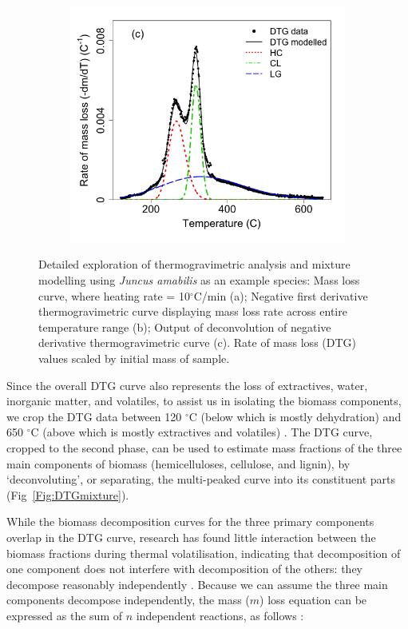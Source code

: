 \documentclass{article}
\begin{document}
\begin{figure}
	\begin{subfigure}[!ht]{0.3\textwidth}
		\includegraphics[width=\textwidth]{figs/DTG-mixture.png}
	\end{subfigure}
	\caption{Detailed exploration of thermogravimetric analysis and mixture modelling using \textit{Juncus amabilis} as an example species: Mass loss curve, where heating rate = 10$^\circ$C/min (a); Negative first derivative thermogravimetric curve displaying mass loss rate across entire temperature range (b); Output of deconvolution of negative derivative thermogravimetric curve (c). Rate of mass loss (DTG) values scaled by initial mass of sample.}
	\label{Fig:TGAmethod}
\end{figure}

Since the overall DTG curve also represents the loss of extractives, water, inorganic matter, and volatiles, to assist us in isolating the biomass components, we crop the DTG data between 120 $^{\circ}$C (below which is mostly dehydration) and 650 $^{\circ}$C (above which is mostly extractives and volatiles) \citep{hu2016,samtani2002}. The DTG curve, cropped to the second phase, can be used to estimate mass fractions of the three main components of biomass (hemicelluloses, cellulose, and lignin), by `deconvoluting', or separating, the multi-peaked curve into its constituent parts (Fig~\ref{Fig:DTGmixture}). 

While the biomass decomposition curves for the three primary components overlap in the DTG curve, research has found little interaction between the biomass fractions during thermal volatilisation, indicating that decomposition of one component does not interfere with decomposition of the others: they decompose reasonably independently \citep{yang2006}. Because we can assume the three main components decompose independently, the mass ($m$) loss equation can be expressed as the sum of $n$ independent reactions, as follows \citep{orfao2001}:
\end{document}
